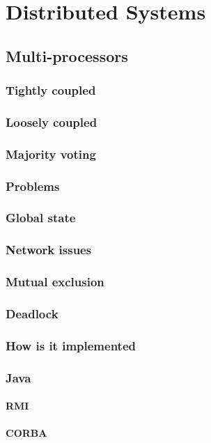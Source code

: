 \documentclass[a4paper,oneside]{report}
\begin{document}
\chapter{Distributed Systems}
	\section{Multi-processors}
    	\subsection{Tightly coupled}
    	\subsection{Loosely coupled}
    	\subsection{Majority voting}
	\subsection{Problems}
 		\subsection{Global state}
    	\subsection{Network issues}
    	\subsection{Mutual exclusion}
    	\subsection{Deadlock}
  	\subsection{How is it implemented}
    	\subsection{Java}
      		\subsubsection{RMI}
      		\subsubsection{CORBA}
\end{document}
